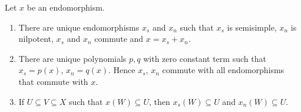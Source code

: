 Let $x$ be an endomorphism.
\begin{enumerate}[label=(\roman*)]
	\item There are unique endomorphisms $x_s$ and $x_n$ such that
		$x_s$ is semisimple, $x_n$ is nilpotent, $x_s$ and $x_n$ commute
		and $x = x_s + x_n$.
	\item There are unique polynomials $p, q$ with zero constant term such that
		$x_s = p(x)$, $x_n = q(x)$. Hence $x_s$, $x_n$ commute with all endomorphisms
		that commute with $x$.
	\item If $U \subseteq V \subseteq X$ such that $x(W) \subseteq U$, then
		$x_s(W) \subseteq U$ and $x_n(W) \subseteq U$.
\end{enumerate}
